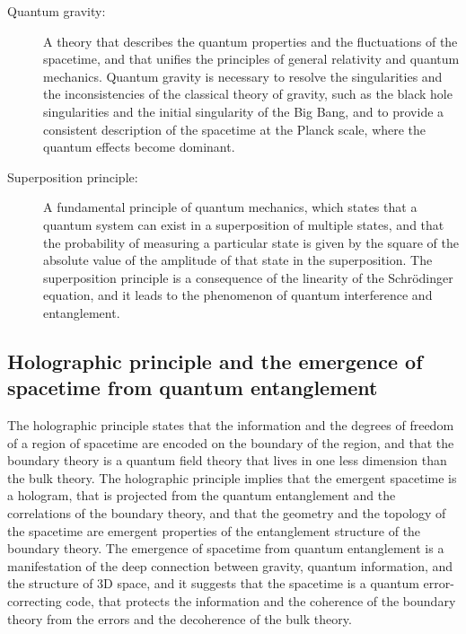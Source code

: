 \begin{tcolorbox}[colback=blue!5!white,colframe=blue!75!black,title=New terms]
    \begin{description}
        \item[Quantum gravity:] A theory that describes the quantum properties and the fluctuations of the spacetime, and that unifies the principles of general relativity and quantum mechanics. Quantum gravity is necessary to resolve the singularities and the inconsistencies of the classical theory of gravity, such as the black hole singularities and the initial singularity of the Big Bang, and to provide a consistent description of the spacetime at the Planck scale, where the quantum effects become dominant.
        \item[Superposition principle:] A fundamental principle of quantum mechanics, which states that a quantum system can exist in a superposition of multiple states, and that the probability of measuring a particular state is given by the square of the absolute value of the amplitude of that state in the superposition. The superposition principle is a consequence of the linearity of the Schrödinger equation, and it leads to the phenomenon of quantum interference and entanglement.
    \end{description}
\end{tcolorbox}

\subsection{Holographic principle and the emergence of spacetime from quantum entanglement}
The holographic principle states that the information and the degrees of freedom of a region of spacetime are encoded on the boundary of the region, and that the boundary theory is a quantum field theory that lives in one less dimension than the bulk theory. The holographic principle implies that the emergent spacetime is a hologram, that is projected from the quantum entanglement and the correlations of the boundary theory, and that the geometry and the topology of the spacetime are emergent properties of the entanglement structure of the boundary theory. The emergence of spacetime from quantum entanglement is a manifestation of the deep connection between gravity, quantum information, and the structure of 3D space, and it suggests that the spacetime is a quantum error-correcting code, that protects the information and the coherence of the boundary theory from the errors and the decoherence of the bulk theory.


